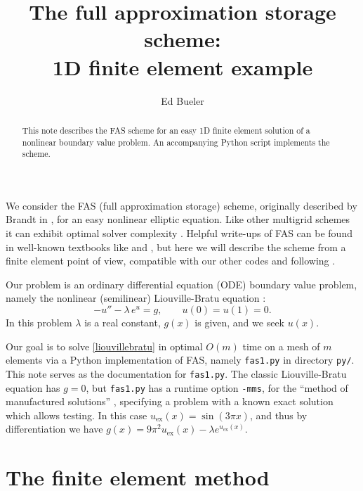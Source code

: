 \documentclass[letterpaper,final,12pt,reqno]{amsart}
\begin{document}
\title[Full approximation storage]{The full approximation storage scheme: \\ 1D finite element example}

\author{Ed Bueler}

\begin{abstract}  This note describes the FAS scheme for an easy 1D finite element solution of a nonlinear boundary value problem.  An accompanying Python script implements the scheme.
\end{abstract}

\maketitle

\thispagestyle{empty}
\bigskip

We consider the FAS (full approximation storage) scheme, originally described by Brandt in \cite{Brandt1977}, for an easy nonlinear elliptic equation.  Like other multigrid schemes it can exhibit optimal solver complexity \cite{Bueler2021}.  Helpful write-ups of FAS can be found in well-known textbooks like \cite[Chapter 6]{Briggsetal2000} and \cite{Trottenbergetal2001}, but here we will describe the scheme from a finite element point of view, compatible with our other codes and following \cite{GraeserKornhuber2009}.

Our problem is an ordinary differential equation (ODE) boundary value problem, namely the nonlinear (semilinear) Liouville-Bratu equation \cite{Bratu1914,Liouville1853}:
\begin{equation}
  -u'' - \lambda\, e^u = g,  \qquad u(0) = u(1) = 0.  \label{liouvillebratu}
\end{equation}
In this problem $\lambda$ is a real constant, $g(x)$ is given, and we seek $u(x)$.

Our goal is to solve \eqref{liouvillebratu} in optimal $O(m)$ time on a mesh of $m$ elements via a Python implementation of FAS, namely \texttt{fas1.py} in directory \texttt{py/}.  This note serves as the documentation for \texttt{fas1.py}.  The classic Liouville-Bratu equation has $g=0$, but \texttt{fas1.py} has a runtime option \texttt{-mms}, for the ``method of manufactured solutions'' \cite{Bueler2021}, specifying a problem with a known exact solution which allows testing.  In this case $u_{\text{ex}}(x)=\sin(3\pi x)$, and thus by differentiation we have $g(x)=9\pi^2 u_{\text{ex}}(x)-\lambda e^{u_{\text{ex}}(x)}$.


\section{The finite element method}
\end{document}
